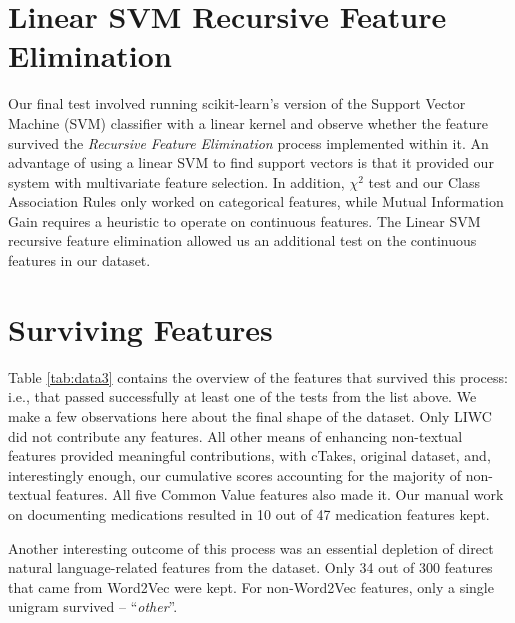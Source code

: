 \section{Linear SVM Recursive Feature Elimination}
Our final test involved running \textsf{scikit-learn}'s version
of the Support Vector Machine (SVM) classifier with
a linear kernel \cite{cortes95} and observe whether the feature survived the
\textit{Recursive Feature Elimination} process implemented
within it. An advantage of using a linear SVM to find support vectors is that 
it provided our system with multivariate feature selection.
In addition, $\chi^2$ test and our Class Association Rules only worked on categorical features, 
while Mutual Information Gain requires a heuristic \cite{Xu07} to operate on continuous features.
The Linear SVM recursive feature elimination allowed us an additional test on
the continuous features in our dataset.

\section{Surviving Features}

Table \ref{tab:data3} contains the overview of the features that
survived this process: i.e., that passed successfully at least one of
the tests from the list above. We make a few observations here
about the final shape of the dataset. Only \textsf{LIWC} did
not contribute any features. All other means of enhancing
non-textual features provided meaningful contributions, 
with \textsf{cTakes}, original dataset, and, interestingly
enough, our cumulative scores accounting for the
majority of non-textual features.  All five \textsf{Common Value}
features also made it. Our manual work on documenting
medications resulted in 10 out of 47 medication
features kept. 

Another  interesting outcome of 
this process was an essential depletion of direct natural language-related
features from the dataset. Only 34 out of 300 features that came
from \textsf{Word2Vec} were kept. For non-Word2Vec features, only a single unigram survived -- ``\textit{other}''.  

